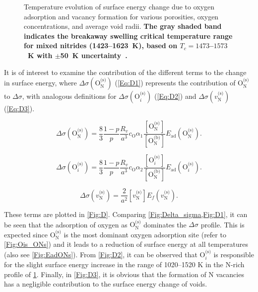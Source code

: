 \documentclass[preprint,12pt,sort&compress]{elsarticle}
\newcommand{\?}{\stackrel{?}{=}}
\providecommand{\DIFaddtex}[1]{{\bf #1}} %
\providecommand{\DIFaddFL}[1]{\DIFadd{#1}} %
\providecommand{\DIFaddbeginFL}{} %
\providecommand{\DIFaddendFL}{} %
\providecommand{\DIFadd}[1]{\texorpdfstring{\DIFaddtex{#1}}{#1}} %
\newcommand{\DIFaddincludegraphics}[2][]{{\color{blue}\fbox{\DIFOincludegraphics[#1]{#2}}}} %
\DeclareRobustCommand{\DIFaddbeginFL}{\DIFOaddbeginFL \let\includegraphics\DIFaddincludegraphics} %
\DeclareRobustCommand{\DIFaddendFL}{\DIFOaddendFL \let\includegraphics\DIFOincludegraphics} %
\begin{document}
\begin{figure}[h!]
\caption{Temperature evolution of surface energy change due to oxygen adsorption and vacancy formation for various porosities, oxygen concentrations, and average void radii. \DIFaddbeginFL \DIFaddFL{The gray shaded band indicates the breakaway swelling critical temperature range for mixed nitrides (1423--1623~K), based on $T_c = 1473$--$1573$~K with $\pm$50~K uncertainty~\cite{Ronchi1978}.}\DIFaddendFL }
\label{Fig:Delta_sigma}
\end{figure}

It is of interest to examine the contribution of the different terms to the change in surface energy, where $\Delta \sigma ( \text{O}_\text{N}^\text{(s)} )$ (\cref{Eq:D1}) represents the contribution of $\text{O}_\text{N}^\text{(s)}$ to $\Delta \sigma$, with analogous definitions for $\Delta \sigma ( \text{O}_i^\text{(s)} )$ (\cref{Eq:D2}) and $\Delta \sigma ( v_\text{N}^\text{(s)} )$ (\cref{Eq:D3}). 

\begin{equation}
\Delta \sigma ( \text{O}_\text{N}^{\text{(s)}} ) = \frac{8}{3} \frac{1-p}{p} \frac{R_v}{a^3} c_\text{O} \alpha_1 \frac{ [ \text{O}_\text{N}^{\text{(s)}} ] }{ [ \text{O}_\text{N}^{\text{(b)}} ] }  E_\text{ad}( \text{O}_\text{N}^{\text{(s)}} ).
\label{Eq:D1}
\end{equation}

\begin{equation}
\Delta \sigma ( \text{O}_i^{\text{(s)}} ) = \frac{8}{3} \frac{1-p}{p} \frac{R_v}{a^3} c_\text{O} \alpha_2 \frac{ [ \text{O}_i^{\text{(s)}} ] }{ [ \text{O}_\text{N}^{\text{(b)}} ] }  E_\text{ad}( \text{O}_i^{\text{(s)}} ).
\label{Eq:D2}
\end{equation}

\begin{equation}
\Delta \sigma (v_\text{N}^{\text{(s)}}) = \frac{2}{a^2} [ v_\text{N}^{\text{(s)}} ] E_f ( v_\text{N}^{\text{(s)}} ).
\label{Eq:D3}
\end{equation}

\noindent These terms are plotted in \cref{Fig:D}. Comparing \cref{Fig:Delta_sigma,Fig:D1}, it can be seen that the adsorption of oxygen as $\text{O}_\text{N}^\text{(s)}$ dominates the $\Delta \sigma$ profile. This is expected since $\text{O}_\text{N}^\text{(s)}$ is the most dominant oxygen adsorption site (refer to \cref{Fig:Ois_ONs}) and it leads to a reduction of surface energy at all temperatures (also see \cref{Fig:EadONs}). From \cref{Fig:D2}, it can be observed that $\text{O}_i^\text{(s)}$ is responsible for the slight surface energy increase in the range of 1020--1520 K in the N-rich profile of \cref{Fig:Delta_sigma}. Finally, in \cref{Fig:D3}, it is obvious that the formation of N vacancies has a negligible contribution to the surface energy change of voids.
\end{document}
